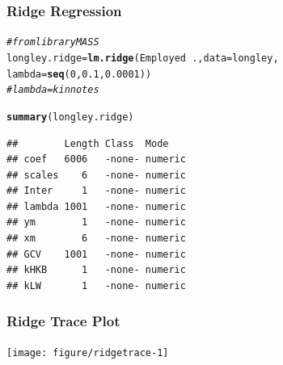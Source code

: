 \documentclass{beamer}\usepackage[]{graphicx}\usepackage[]{color}
\makeatletter
\newcommand{\hlnum}[1]{\textcolor[rgb]{0.686,0.059,0.569}{#1}}%
\newcommand{\hlcom}[1]{\textcolor[rgb]{0.678,0.584,0.686}{\textit{#1}}}%
\newcommand{\hlopt}[1]{\textcolor[rgb]{0,0,0}{#1}}%
\newcommand{\hlstd}[1]{\textcolor[rgb]{0.345,0.345,0.345}{#1}}%
\newcommand{\hlkwb}[1]{\textcolor[rgb]{0.69,0.353,0.396}{#1}}%
\newcommand{\hlkwc}[1]{\textcolor[rgb]{0.333,0.667,0.333}{#1}}%
\newcommand{\hlkwd}[1]{\textcolor[rgb]{0.737,0.353,0.396}{\textbf{#1}}}%
\newenvironment{kframe}{%
 \def\at@end@of@kframe{}%
 \ifinner\ifhmode%
  \def\at@end@of@kframe{\end{minipage}}%
  \begin{minipage}{\columnwidth}%
 \fi\fi%
 \def\FrameCommand##1{\hskip\@totalleftmargin \hskip-\fboxsep
 \colorbox{shadecolor}{##1}\hskip-\fboxsep
     \hskip-\linewidth \hskip-\@totalleftmargin \hskip\columnwidth}%
 \MakeFramed {\advance\hsize-\width
   \@totalleftmargin\z@ \linewidth\hsize
   \@setminipage}}%
 {\par\unskip\endMakeFramed%
 \at@end@of@kframe}
\newenvironment{knitrout}{}{} %
\makeatother
\begin{document}
\begin{frame}[fragile]  \frametitle{Ridge Regression}
\begin{knitrout}
\color{fgcolor}\begin{kframe}
\begin{alltt}
\hlcom{# from library MASS}
\hlstd{longley.ridge} \hlkwb{=} \hlkwd{lm.ridge}\hlstd{(Employed} \hlopt{~} \hlstd{.,} \hlkwc{data}\hlstd{=longley,}
                         \hlkwc{lambda}\hlstd{=}\hlkwd{seq}\hlstd{(}\hlnum{0}\hlstd{,} \hlnum{0.1}\hlstd{,} \hlnum{0.0001}\hlstd{))}
\hlcom{# lambda = k in notes}

\hlkwd{summary}\hlstd{(longley.ridge)}
\end{alltt}
\begin{verbatim}
##        Length Class  Mode   
## coef   6006   -none- numeric
## scales    6   -none- numeric
## Inter     1   -none- numeric
## lambda 1001   -none- numeric
## ym        1   -none- numeric
## xm        6   -none- numeric
## GCV    1001   -none- numeric
## kHKB      1   -none- numeric
## kLW       1   -none- numeric
\end{verbatim}
\end{kframe}
\end{knitrout}
\end{frame}


\begin{frame}[fragile]  \frametitle{Ridge Trace Plot}
\begin{knitrout}
\color{fgcolor}
\texttt{[image: figure/ridgetrace-1]} 

\end{knitrout}
\end{frame}
\end{document}
